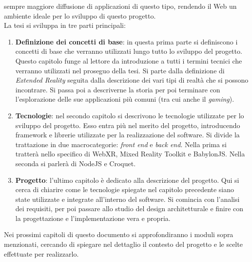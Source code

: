 sempre maggiore diffusione di applicazioni di questo tipo, rendendo il Web un ambiente ideale per lo sviluppo di questo progetto.\\
\newline
La tesi si sviluppa in tre parti principali:
\begin{enumerate}
    \item \textbf{Definizione dei concetti di base}: in questa prima parte si definiscono i concetti di base che verranno utilizzati lungo tutto lo sviluppo del progetto. Questo 
    capitolo funge al lettore da introduzione a tutti i termini tecnici che verranno utilizzati nel proseguo della tesi. Si parte dalla definizione di \textit{Extended Reality} seguita
    dalla descrizione dei vari tipi di realtà che si possono incontrare. Si passa poi a descriverne la storia per poi terminare con l'esplorazione delle sue applicazioni
    più comuni (tra cui anche il \textit{gaming}).
    \item \textbf{Tecnologie}: nel secondo capitolo si descrivono le tecnologie utilizzate per lo sviluppo del progetto. Esso entra più nel merito del progetto, 
    introducendo framework e librerie utilizzate per la realizzazione del software. Si divide la trattazione in due macrocategorie: \textit{front end} e \textit{back end}. Nella prima
    si tratterà nello specifico di WebXR, Mixed Reality Toolkit e BabylonJS. Nella seconda si parlerà di NodeJS e Croquet.
    \item \textbf{Progetto}: l'ultimo capitolo è dedicato alla descrizione del progetto. Qui si cerca di chiarire come le tecnologie spiegate nel capitolo precedente siano state
    utilizzate e integrate all'interno del software. Si comincia con l'analisi dei requisiti, per poi passare allo studio del design architetturale e finire con la progettazione e
    l'implementazione vera e propria.
\end{enumerate}
Nei prossimi capitoli di questo documento si approfondiranno i moduli sopra menzionati, cercando di spiegare nel dettaglio il contesto del progetto e le scelte effettuate per
realizzarlo. 